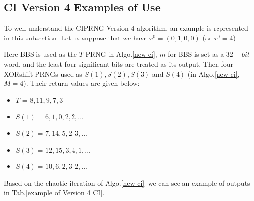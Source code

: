 \subsection{CI Version 4 Examples of Use}
To well understand the CIPRNG Version 4 algorithm, an example is represented in this subsection. Let us suppose that we have $x^0 = (0,1,0,0)$ (or $x^0 = 4$). 

Here BBS is used as the $T$ PRNG in Algo.\ref{new ci}, $m$ for BBS is set as a $32-bit$ word, and the least four significant bits are treated as its output. Then four XORshift PRNGs used as $S(1),S(2),S(3)$ and $S(4)$ (in Algo.\ref{new ci}, $M = 4$). Their return values are given below:
\begin{itemize}
\item $T$ = $8,11,9,7,3$
\item $S(1)$ = $6,1,0,2,2, . . .$
\item $S(2)$ = $7,14,5,2,3, . . .$
\item $S(3)$ = $12,15,3,4,1, . . .$
\item $S(4)$ = $10,6,2,3,2, . . .$
\end{itemize}
Based on the chaotic iteration of Algo.\ref{new ci}, we can see an example of outputs in Tab.\ref{example of Version 4 CI}. %

\begin{table}
\centering
{}
\caption{CIPRNG version 4: example of use}
\label{example of Version 4 CI}
\end{table}


